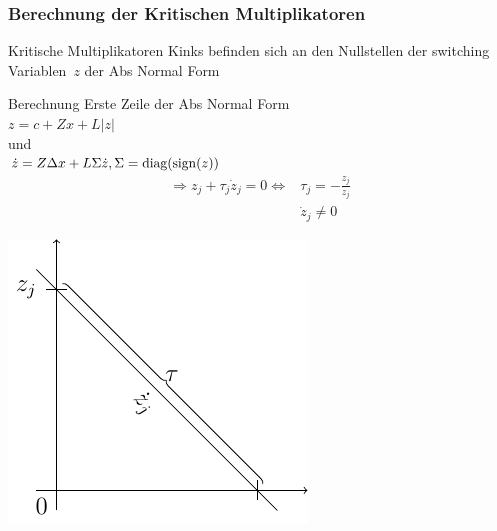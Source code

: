 \begin{frame}[<+->]
\frametitle{Berechnung der Kritischen Multiplikatoren}
\begin{minipage}{0.5\textwidth} 
	\begin{block}{Kritische Multiplikatoren}
	 \glqq Kinks befinden sich an den Nullstellen der switching Variablen~$z$ der Abs Normal Form \grqq
	\end{block}
	\begin{block}{Berechnung}
	   Erste Zeile der Abs Normal Form\\
	   $ z = c+ Zx+L|z|$\\
	    und\\
	   $\dot z = Z\Delta x+L\Sigma \dot z, \Sigma = \operatorname{diag}(\operatorname{sign}(z))$
	    \begin{align*}
	    \Rightarrow z_j + \tau_j \dot z_j = 0 \iff & \tau_j = -\frac{z_j}{\dot z_j}\\
						       & \dot z_j\neq 0
	    \end{align*}
	\end{block}
	\end{minipage}
	\hfill
	\begin{minipage}{0.4\textwidth}
	\includegraphics[width=\linewidth]{../dipl_tex/img/tikz/finding_kinks.pdf}	
	\end{minipage}
\end{frame}
